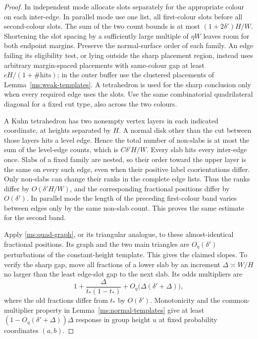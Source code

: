 \documentclass[11pt]{article}
\numberwithin{equation}{section}
\theoremstyle{definition}
\theoremstyle{remark}
\begin{document}
\begin{proof}
In independent mode allocate slots separately for the appropriate
colour on each inter-edge.  In parallel mode use one list, all
first-colour slots before all second-colour slots.  The sum of the
two count bounds is at most $(1+2\delta')H/W$.  Shortening the slot
spacing by a sufficiently large multiple of $\eta W$ leaves room
for both endpoint margins.  Preserve the normal-surface order of
each family.  An edge failing its eligibility test, or lying outside
the sharp placement region, instead uses arbitrary margin-spaced
placements with same-colour gap at least
$cH/(1+\#\text{hits})$; in the outer buffer use the clustered
placements of Lemma~\ref{ms:weak-templates}.  A tetrahedron is used for
the sharp conclusion only when every required edge uses the slots.
Use the same combinatorial quadrilateral diagonal for a fixed cut
type, also across the two colours.

A Kuhn tetrahedron has two nonempty vertex layers in each indicated
coordinate, at heights separated by $H$.  A normal disk other than
the cut between those layers hits a level edge.  Hence the total
number of non-slabs is at most the sum of the level-edge counts,
which is $C\delta'H/W$.  Every slab hits every inter-edge once.
Slabs of a fixed family are nested, so their order toward the upper
layer is the same on every such edge, even when their positive
label coorientations differ.  Only non-slabs can change their ranks
in the complete edge lists.  Thus the ranks differ by
$O(\delta'H/W)$, and the corresponding fractional positions differ
by $O(\delta')$.  In parallel mode the length of the preceding
first-colour band varies between edges only by the same non-slab
count.  This proves the same estimate for the second band.

Apply \eqref{ms:quad-graph}, or its triangular analogue, to these
almost-identical fractional positions.  Its graph and the two main
triangles are $O_\eta(\delta')$ perturbations of the constant-height
template.  This gives the claimed slopes.  To verify the sharp gap,
move all fractions of a lower slab by an increment
$\Delta\asymp W/H$ no larger than the least edge-slot gap to the
next slab.  Its odds multipliers are
\[
 1+\frac{\Delta}{t_*(1-t_*)}
       +O_\eta\bigl(\Delta(\delta'+\Delta)\bigr),
\]
where the old fractions differ from $t_*$ by $O(\delta')$.
Monotonicity and the common-multiplier property in
Lemma~\ref{ms:normal-templates} give at least
$(1-O_\eta(\delta'+\Delta))\Delta$ response in group height $u$ at
fixed probability coordinates $(a,b)$.


\end{proof}
\end{document}
